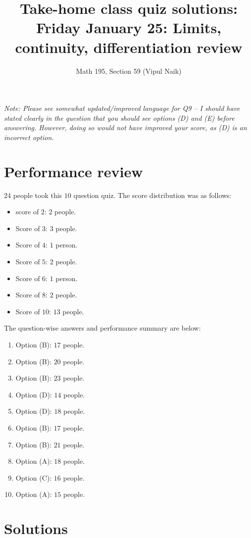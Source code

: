 \documentclass[10pt]{amsart}
\title{Take-home class quiz solutions: Friday January 25: Limits, continuity, differentiation review}
\author{Math 195, Section 59 (Vipul Naik)}
\begin{document}
\maketitle

{\em Note: Please see somewhat updated/improved language for Q9 -- I
should have stated clearly in the question that you should see options
(D) and (E) before answering. However, doing so would not have
improved your score, as (D) is an incorrect option.}

\section{Performance review}

$24$ people took this $10$ question quiz. The score distribution was
as follows:

\begin{itemize}
\item score of $2$: $2$ people.
\item Score of $3$: $3$ people.
\item Score of $4$: $1$ person.
\item Score of $5$: $2$ people.
\item Score of $6$: $1$ person.
\item Score of $8$: $2$ people.
\item Score of $10$: $13$ people.
\end{itemize}

The question-wise answers and performance summary are below:

\begin{enumerate}
\item Option (B): $17$ people.
\item Option (B): $20$ people.
\item Option (B): $23$ people.
\item Option (D): $14$ people.
\item Option (D): $18$ people.
\item Option (B): $17$ people.
\item Option (B): $21$ people.
\item Option (A): $18$ people.
\item Option (C): $16$ people.
\item Option (A): $15$ people.
\end{enumerate}

\section{Solutions}
\end{document}
